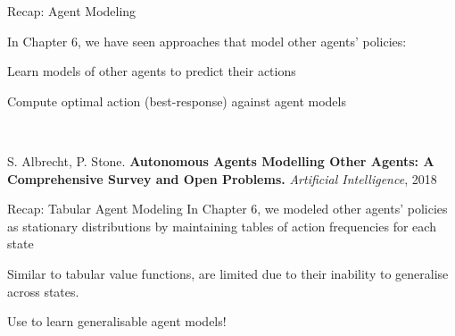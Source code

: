 \begin{frame}[t]{Recap: Agent Modeling}
    \begin{reminderbox}
        In Chapter 6, we have seen approaches that model other agents' policies:

        \blist
            \item Learn models of other agents to predict their actions
            \item Compute optimal action (best-response) against agent models
        \elist

        \begin{center}
             \\[1.5em]
        \end{center}

        S. Albrecht, P. Stone. {\bf Autonomous Agents Modelling Other Agents: A Comprehensive Survey and Open Problems.} {\it Artificial Intelligence}, 2018
    \end{reminderbox}
\end{frame}

\begin{frame}[t]{Recap: Tabular Agent Modeling}
    In Chapter 6, we modeled other agents' policies as stationary distributions by maintaining tables of action frequencies for each state

    \pause

    \begin{problembox}
        Similar to tabular value functions,  are limited due to their inability to generalise across states.
    \end{problembox}

    \pause

    \begin{solutionbox}
        Use  to learn generalisable agent models!
    \end{solutionbox}
\end{frame}

